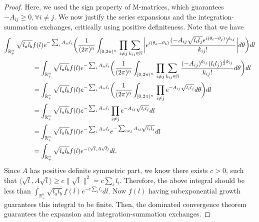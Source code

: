 \documentclass[10pt,a4paper]{amsart}
\newcommand{\compi}{\textnormal{i}}
\begin{document}
\begin{proof}
Here, we used the sign property of M-matrices, which guarantees $-A_{ij}\geq 0, \forall i\neq j$. We now justify the series expansions and the integration-summation exchanges, critically using positive definiteness. Note that we have
    \begin{align*}
    \int_{\mathbb{R}_+^n}\sqrt{l_a l_b} & f(l) e^{-\sum_{i} A_{ii}l_i}\bigg(\frac{1}{(2\pi)^n}\int_{[0,2\pi)^n}\, \prod_{i\neq j}\sum_{k_{ij}\in\mathbb{N}} \bigg|e^{\compi(\theta_a-\theta_b)}\frac{(- A_{ij}\sqrt{l_i l_j}e^{\compi(\theta_i-\theta_j)})^{k_{ij}}}{k_{ij}!}\bigg| d\theta\bigg) dl\\
    &= \int_{\mathbb{R}_+^n}\sqrt{l_a l_b} f(l) e^{-\sum_{i} A_{ii}l_i}\bigg(\frac{1}{(2\pi)^n}\int_{[0,2\pi)^n}\, \prod_{i\neq j}\sum_{k_{ij}\in\mathbb{N}} \frac{(-A_{ij})^{k_{ij}}(l_i l_j)^{\frac{1}{2}k_{ij}}}{k_{ij}!} d\theta\bigg) dl\\
    &= \int_{\mathbb{R}_+^n}\sqrt{l_a l_b} f(l) e^{-\sum_{i} A_{ii}l_i}\bigg(\frac{1}{(2\pi)^n}\int_{[0,2\pi)^n}\, \prod_{i\neq j}e^{-A_{ij}\sqrt{l_i l_j}} d\theta\bigg) dl\\
    &= \int_{\mathbb{R}_+^n}\sqrt{l_a l_b} f(l) e^{-\sum_{i} A_{ii}l_i} \prod_{i\neq j}e^{-A_{ij}\sqrt{l_i l_j}} dl\\
    &= \int_{\mathbb{R}_+^n}\sqrt{l_a l_b} f(l) e^{-\sum_{i} A_{ii}l_i} e^{-\sum_{i\neq j}A_{ij}\sqrt{l_i l_j}} dl\\
    &= \int_{\mathbb{R}_+^n}\sqrt{l_a l_b} f(l) e^{-\langle \sqrt{l}, A\sqrt{l}\rangle} dl.
    \end{align*}
Since $A$ has positive definite symmetric part, we know there exists $c>0$, such that $\langle \sqrt{l}, A\sqrt{l}\rangle \geq c\|\sqrt{l}\|^2=c\sum_il_i$. Therefore, the above integral should be less than $ \int_{\mathbb{R}_+^n}\sqrt{l_a l_b} f(l) e^{-c\sum_i l_i} dl.$ Now $f(l)$ having subexponential growth guarantees this integral to be finite. Then, the dominated convergence theorem guarantees the expansion and integration-summation exchanges.
\end{proof}
\end{document}
